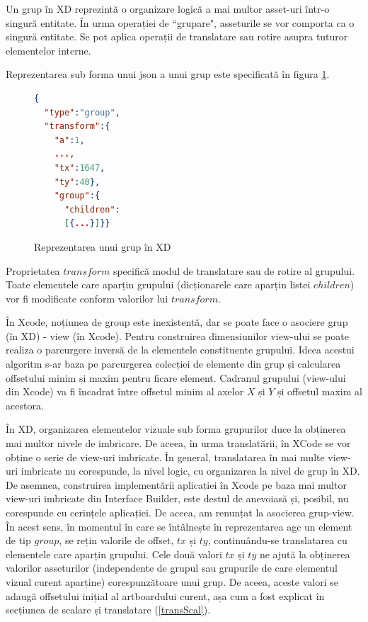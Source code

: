 Un grup în XD reprezintă o organizare logică a mai multor asset-uri într-o singură entitate. În urma operației de ``grupare", asseturile se vor comporta ca o singură entitate. Se pot aplica operații de translatare sau rotire asupra tuturor elementelor interne. 

Reprezentarea sub forma unui json a unui grup este specificată în figura \ref{fig:Group}. 

\begin{figure}[!htbp]
\begin{lstlisting}[language=json,firstnumber=1]
{
  "type":"group",
  "transform":{
    "a":1,
    ...,
    "tx":1647,
    "ty":40},
    "group":{
      "children":
      [{...}]}}
\end{lstlisting}
\caption{Reprezentarea unui grup în XD} \label{fig:Group}
\end{figure}

Proprietatea $transform$ specifică modul de translatare sau de rotire al grupului. Toate elementele care aparțin grupului (dicționarele care aparțin listei $children$) vor fi modificate conform valorilor lui $transform$.

În Xcode, noțiunea de group este inexistentă, dar se poate face o asociere grup (în XD) - view (în Xcode).  
Pentru construirea dimensiunilor view-ului se poate realiza o parcurgere inversă de la elementele constituente grupului. Ideea acestui algoritm s-ar baza pe parcurgerea colecției de elemente din grup și calcularea offsetului minim și maxim pentru ficare element. Cadranul grupului (view-ului din Xcode) va fi încadrat între offsetul minim al axelor $X$ și $Y$ și offsetul maxim al acestora.

În XD, organizarea elementelor vizuale sub forma grupurilor duce la obținerea mai multor nivele de imbricare. De aceea, în urma translatării, în XCode se vor obține o serie de view-uri imbricate. În general, translatarea în mai multe view-uri imbricate nu corespunde, la nivel logic, cu organizarea la nivel de grup în XD. De asemnea, construirea implementării aplicației în Xcode pe baza mai multor view-uri imbricate din Interface Builder, este destul de anevoiasă și, posibil, nu corespunde cu cerințele aplicației. De aceea, am renunțat la asocierea grup-view. În acest sens, în momentul în care se întâlnește în reprezentarea agc un element de tip $group$, se rețin valorile de offset, $tx$ și $ty$, continuându-se translatarea cu elementele care aparțin grupului.  Cele două valori $tx$ și $ty$ ne ajută la obținerea valorilor asseturilor (independente de grupul sau grupurile de care elementul vizual curent aparține) corespunzătoare unui grup. De aceea, aceste valori se adaugă offsetului inițial al artboardului curent, așa cum a fost explicat în secțiunea de scalare și translatare (\ref{transScal}).

